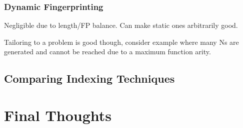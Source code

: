 \subsubsection{Dynamic Fingerprinting}
Negligible due to length/FP balance. Can make static ones arbitrarily good.

Tailoring to a problem is good though, consider example where many Ns are generated
and cannot be reached due to a maximum function arity.

\subsection{Comparing Indexing Techniques}

\section{Final Thoughts}

